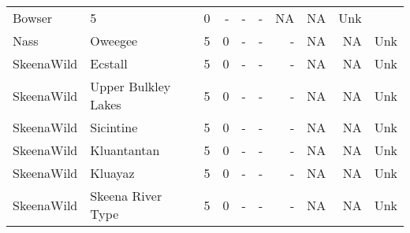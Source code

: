\documentclass[french,11pt]{book}
\begin{document}
\begin{longtable}[t]{llrrrrrrrr}
Bowser & 5 & 0 & - & - & - & NA & NA & Unk\\ Nass & Oweegee & 5 & 0 & - & - & - & NA & NA & Unk\\ SkeenaWild & Ecstall & 5 & 0 & - & - & - & NA & NA & Unk\\ SkeenaWild & Upper Bulkley Lakes & 5 & 0 & - & - & - & NA & NA & Unk\\ SkeenaWild & Sicintine & 5 & 0 & - & - & - & NA & NA & Unk\\ SkeenaWild & Kluantantan & 5 & 0 & - & - & - & NA & NA & Unk\\ SkeenaWild & Kluayaz & 5 & 0 & - & - & - & NA & NA & Unk\\ SkeenaWild & Skeena River Type & 5 & 0 & - & - & - & NA & NA & Unk\\* \end{longtable}

\endgroup{} \endgroup{}

\clearpage
\end{document}
